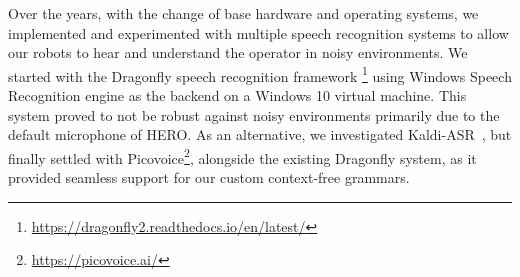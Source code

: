 \label{sec:speech_rec}
Over the years, with the change of base hardware and operating systems, we implemented and experimented with multiple speech recognition systems to allow our robots to hear and understand the operator in noisy environments.
We started with the Dragonfly speech recognition framework \footnote{\url{https://dragonfly2.readthedocs.io/en/latest/}} using Windows Speech Recognition engine as the backend on a Windows 10 virtual machine.
This system proved to not be robust against noisy environments primarily due to the default microphone of HERO.
As an alternative, we investigated Kaldi-ASR~\cite{Povey:192584}, but finally settled with Picovoice\footnote{\url{https://picovoice.ai/}}, alongside the existing Dragonfly system, as it provided seamless support for our custom context-free grammars.